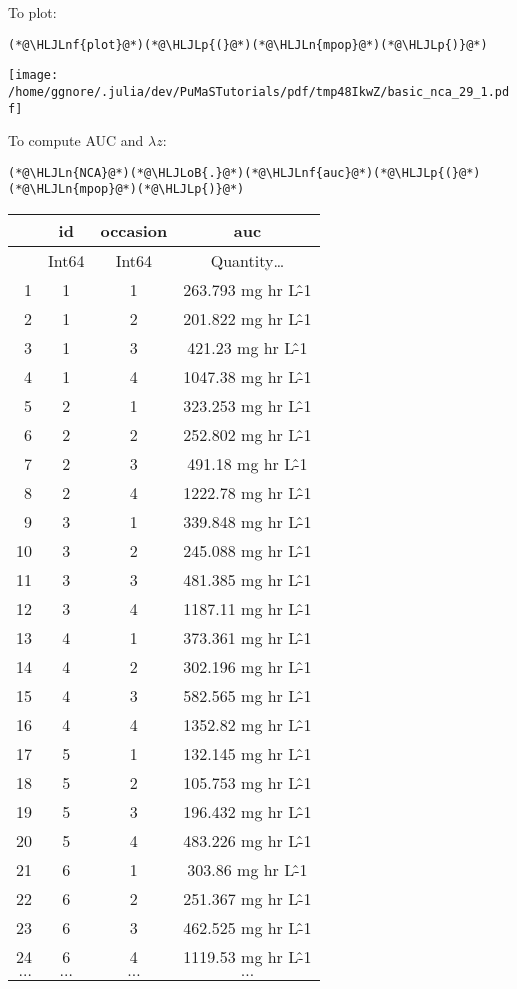 \documentclass[12pt,a4paper]{article}
\newcommand{\HLJLn}[1]{#1}
\newcommand{\HLJLnf}[1]{\textcolor[RGB]{66,102,213}{#1}}
\newcommand{\HLJLoB}[1]{\textcolor[RGB]{102,102,102}{\textbf{#1}}}
\newcommand{\HLJLp}[1]{#1}
\begin{document}
To plot:


\begin{lstlisting}
(*@\HLJLnf{plot}@*)(*@\HLJLp{(}@*)(*@\HLJLn{mpop}@*)(*@\HLJLp{)}@*)
\end{lstlisting}

\texttt{[image: /home/ggnore/.julia/dev/PuMaSTutorials/pdf/tmp48IkwZ/basic\_nca\_29\_1.pdf]}

To compute AUC and $\lambda z$:


\begin{lstlisting}
(*@\HLJLn{NCA}@*)(*@\HLJLoB{.}@*)(*@\HLJLnf{auc}@*)(*@\HLJLp{(}@*)(*@\HLJLn{mpop}@*)(*@\HLJLp{)}@*)
\end{lstlisting}


\begin{tabular}{r|ccc}
	& id & occasion & auc\\
	\hline
	& Int64 & Int64 & Quantity…\\
	\hline
	1 & 1 & 1 & 263.793 mg hr L\^-1 \\
	2 & 1 & 2 & 201.822 mg hr L\^-1 \\
	3 & 1 & 3 & 421.23 mg hr L\^-1 \\
	4 & 1 & 4 & 1047.38 mg hr L\^-1 \\
	5 & 2 & 1 & 323.253 mg hr L\^-1 \\
	6 & 2 & 2 & 252.802 mg hr L\^-1 \\
	7 & 2 & 3 & 491.18 mg hr L\^-1 \\
	8 & 2 & 4 & 1222.78 mg hr L\^-1 \\
	9 & 3 & 1 & 339.848 mg hr L\^-1 \\
	10 & 3 & 2 & 245.088 mg hr L\^-1 \\
	11 & 3 & 3 & 481.385 mg hr L\^-1 \\
	12 & 3 & 4 & 1187.11 mg hr L\^-1 \\
	13 & 4 & 1 & 373.361 mg hr L\^-1 \\
	14 & 4 & 2 & 302.196 mg hr L\^-1 \\
	15 & 4 & 3 & 582.565 mg hr L\^-1 \\
	16 & 4 & 4 & 1352.82 mg hr L\^-1 \\
	17 & 5 & 1 & 132.145 mg hr L\^-1 \\
	18 & 5 & 2 & 105.753 mg hr L\^-1 \\
	19 & 5 & 3 & 196.432 mg hr L\^-1 \\
	20 & 5 & 4 & 483.226 mg hr L\^-1 \\
	21 & 6 & 1 & 303.86 mg hr L\^-1 \\
	22 & 6 & 2 & 251.367 mg hr L\^-1 \\
	23 & 6 & 3 & 462.525 mg hr L\^-1 \\
	24 & 6 & 4 & 1119.53 mg hr L\^-1 \\
	$\dots$ & $\dots$ & $\dots$ & $\dots$ \\
\end{tabular}
\end{document}
